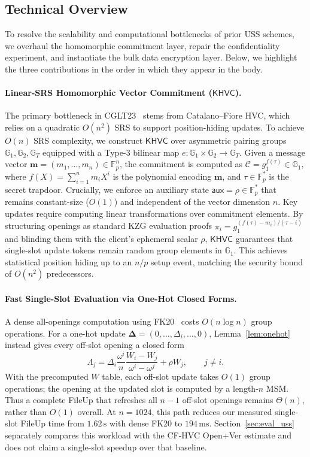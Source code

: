 \subsection{Technical Overview}
\label{sec:intro_technique_overview}

To resolve the scalability and computational bottlenecks of prior USS schemes, we overhaul the homomorphic commitment layer, repair the confidentiality experiment, and instantiate the bulk data encryption layer. Below, we highlight the three contributions in the order in which they appear in the body.

\paragraph{Linear-SRS Homomorphic Vector Commitment ($\mathsf{KHVC}$).}
The primary bottleneck in CGLT23~\cite{CGLT23} stems from Catalano--Fiore HVC, which relies on a quadratic $O(n^2)$ SRS to support position-hiding updates. 
To achieve $O(n)$ SRS complexity, we construct $\mathsf{KHVC}$ over asymmetric pairing groups $\mathbb{G}_1, \mathbb{G}_2, \mathbb{G}_T$ equipped with a Type-3 bilinear map $e: \mathbb{G}_1 \times \mathbb{G}_2 \to \mathbb{G}_T$. 
Given a message vector $\mathbf{m} = (m_1, \dots, m_n) \in \mathbb{F}_p^n$, the commitment is computed as $\mathcal{C} = g_1^{f(\tau)} \in \mathbb{G}_1$, where $f(X) = \sum_{i=1}^n m_i X^i$ is the polynomial encoding $\mathbf{m}$, and $\tau \in \mathbb{F}_p^*$ is the secret trapdoor. Crucially, we enforce an auxiliary state $\mathsf{aux} = \rho \in \mathbb{F}_p^*$ that remains constant-size ($O(1)$) and independent of the vector dimension $n$.
Key updates require computing linear transformations over commitment elements. By structuring openings as standard KZG evaluation proofs $\pi_i = g_1^{(f(\tau) - m_i)/(\tau - i)}$ and blinding them with the client's ephemeral scalar $\rho$, $\mathsf{KHVC}$ guarantees that single-slot update tokens remain random group elements in $\mathbb{G}_1$. This achieves statistical position hiding up to an $n/p$ setup event, matching the security bound of $O(n^2)$ predecessors.

\paragraph{Fast Single-Slot Evaluation via One-Hot Closed Forms.}
A dense all-openings computation using FK20~\cite{FK20} costs $O(n\log n)$ group operations. For a one-hot update $\mathbf{\Delta}=(0,\dots,\Delta_i,\dots,0)$, Lemma~\ref{lem:onehot} instead gives every off-slot opening a closed form
\[
 \Lambda_j=\Delta_i\frac{\omega^i}{n}\frac{W_i-W_j}{\omega^i-\omega^j}+\rho W_j,
 \qquad j\ne i .
\]
With the precomputed $W$ table, each off-slot update takes $O(1)$ group operations; the opening at the updated slot is computed by a length-$n$ MSM. Thus a complete FileUp that refreshes all $n-1$ off-slot openings remains $\Theta(n)$, rather than $O(1)$ overall. At $n=1024$, this path reduces our measured single-slot FileUp time from $1.62\,\mathrm{s}$ with dense FK20 to $194\,\mathrm{ms}$. Section~\ref{sec:eval_uss} separately compares this workload with the CF-HVC Open+Ver estimate and does not claim a single-slot speedup over that baseline.


